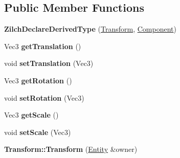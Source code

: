 \subsection*{Public Member Functions}
\begin{DoxyCompactItemize}
\item 
\hypertarget{classDCEngine_1_1Components_1_1Transform_a259a5add19b71a770685f034d140ae28}{{\bfseries Zilch\-Declare\-Derived\-Type} (\hyperlink{classDCEngine_1_1Components_1_1Transform}{Transform}, \hyperlink{classDCEngine_1_1Component}{Component})}\label{classDCEngine_1_1Components_1_1Transform_a259a5add19b71a770685f034d140ae28}

\item 
\hypertarget{classDCEngine_1_1Components_1_1Transform_ae8a4267e377c1ecd299d6e8943facafc}{Vec3 {\bfseries get\-Translation} ()}\label{classDCEngine_1_1Components_1_1Transform_ae8a4267e377c1ecd299d6e8943facafc}

\item 
\hypertarget{classDCEngine_1_1Components_1_1Transform_a7f3bcf4f9e3d471aa76c1a6792a0d769}{void {\bfseries set\-Translation} (Vec3)}\label{classDCEngine_1_1Components_1_1Transform_a7f3bcf4f9e3d471aa76c1a6792a0d769}

\item 
\hypertarget{classDCEngine_1_1Components_1_1Transform_a1dc010f97290122c93514300c518d476}{Vec3 {\bfseries get\-Rotation} ()}\label{classDCEngine_1_1Components_1_1Transform_a1dc010f97290122c93514300c518d476}

\item 
\hypertarget{classDCEngine_1_1Components_1_1Transform_a822d1c7dc8017035e69ce460219b3b50}{void {\bfseries set\-Rotation} (Vec3)}\label{classDCEngine_1_1Components_1_1Transform_a822d1c7dc8017035e69ce460219b3b50}

\item 
\hypertarget{classDCEngine_1_1Components_1_1Transform_a395ce211ee955fda94feeb994729af5c}{Vec3 {\bfseries get\-Scale} ()}\label{classDCEngine_1_1Components_1_1Transform_a395ce211ee955fda94feeb994729af5c}

\item 
\hypertarget{classDCEngine_1_1Components_1_1Transform_ada32a2b7c08b1301984272476dae4ea7}{void {\bfseries set\-Scale} (Vec3)}\label{classDCEngine_1_1Components_1_1Transform_ada32a2b7c08b1301984272476dae4ea7}

\item 
\hypertarget{classDCEngine_1_1Components_1_1Transform_abe5864047b9b9deec99d9b8c606e69f7}{{\bfseries Transform\-::\-Transform} (\hyperlink{classDCEngine_1_1Entity}{Entity} \&owner)}\label{classDCEngine_1_1Components_1_1Transform_abe5864047b9b9deec99d9b8c606e69f7}


\end{DoxyCompactItemize}

